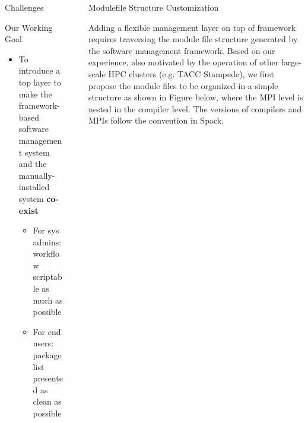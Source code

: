 \documentclass[final]{beamer}
\newlength{\sepwid}
\newlength{\onecolwid}
\begin{document}
\begin{frame}[t]
\begin{columns}[t]
\begin{column}{\onecolwid}
\begin{block}{Challenges}
\end{block}

\begin{block}{Our Working Goal}
\setlength{\leftmargini}{1cm}
\setlength{\leftmarginii}{3.5cm}
\setlength{\leftmarginiii}{2.5cm}
\begin{itemize}
    \item To introduce a top layer to make the framework-based software management system and the manually-installed system \textbf{co-exist}
        \vspace{0.25em}
        \begin{itemize}
            \item For sys admins:  workflow scriptable as much as possible
            \item For end users:   package list presented as clean as possible
        \end{itemize}


\end{itemize}
\end{block}



\end{column} %



\begin{column}{\sepwid}\end{column} %

\begin{column}{\onecolwid} %



\begin{block}{Modulefile Structure Customization}

Adding a flexible management layer on top of framework requires traversing the module file structure generated by the software management framework.
Based on our experience, also motivated by the operation of other large-scale HPC clusters (e.g. TACC Stampede), we first propose the module files to be organized in a simple structure as shown in Figure below, where the MPI level is nested in the compiler level. 
The versions of compilers and MPIs follow the convention in Spack. 


\end{block}
\end{column}
\end{columns}
\end{frame}
\end{document}
